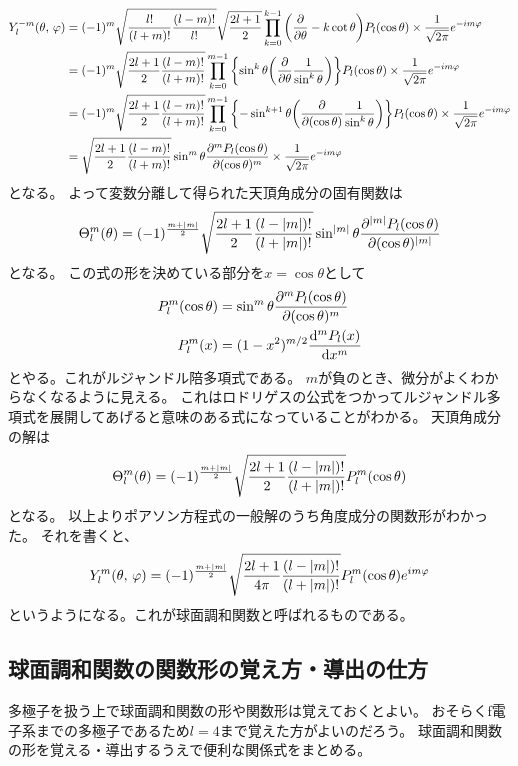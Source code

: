 \documentclass[../../master.tex]{subfiles}
\begin{document}
\begin{align}
	Y_l^{-m}(\theta,\,\varphi)
	 & =(-1)^m\sqrt{\frac{l!}{(l+m)!}\frac{(l-m)!}{l!}}\sqrt{\frac{2l+1}{2}} \prod_{k=0}^{k-1}\qty(\pdv{\theta}-k\cot\theta)P_l(\cos\theta)\times\frac{1}{\sqrt{2\pi}}e^{-im\varphi}                    \\
	 & =(-1)^m\sqrt{\frac{2l+1}{2}\frac{(l-m)!}{(l+m)!}} \prod_{k=0}^{m-1}\qty{\sin^k\theta\qty(\pdv{\theta}\frac{1}{\sin^k\theta})}P_l(\cos\theta)\times\frac{1}{\sqrt{2\pi}}e^{-im\varphi}            \\
	 & =(-1)^m\sqrt{\frac{2l+1}{2}\frac{(l-m)!}{(l+m)!}} \prod_{k=0}^{m-1}\qty{-\sin^{k+1}\theta\qty(\pdv{(\cos\theta)}\frac{1}{\sin^k\theta})}P_l(\cos\theta)\times\frac{1}{\sqrt{2\pi}}e^{-im\varphi} \\
	 & =\sqrt{\frac{2l+1}{2}\frac{(l-m)!}{(l+m)!}} \sin^{m}\theta\pdv[m]{P_l(\cos\theta)}{(\cos\theta)}\times\frac{1}{\sqrt{2\pi}}e^{-im\varphi}
\end{align}
となる。
よって変数分離して得られた天頂角成分の固有関数は
\begin{equation}
	\Theta_l^m(\theta) = (-1)^{\frac{m+\abs{m}}{2}}\sqrt{\frac{2l+1}{2}\frac{(l-\abs{m})!}{(l+\abs{m})!}} \sin^{\abs{m}}\theta\pdv[\abs{m}]{P_l(\cos\theta)}{(\cos\theta)}
\end{equation}
となる。
この式の形を決めている部分を\(x=\cos\theta\)として
\begin{align}
	P_l^m(\cos\theta) &= \sin^m\theta\pdv[m]{P_l(\cos\theta)}{(\cos\theta)}\\
	P_l^m(x) &=(1-x^2)^{m/2}\dv[m]{P_l(x)}{x}
\end{align}
とやる。これがルジャンドル陪多項式である。
\(m\)が負のとき、微分がよくわからなくなるように見える。
これはロドリゲスの公式をつかってルジャンドル多項式を展開してあげると意味のある式になっていることがわかる。
天頂角成分の解は
\begin{equation}
	\Theta_l^m(\theta) = (-1)^{\frac{m+\abs{m}}{2}}\sqrt{\frac{2l+1}{2}\frac{(l-\abs{m})!}{(l+\abs{m})!}} P_l^{m}(\cos\theta)
\end{equation}
となる。
以上よりポアソン方程式の一般解のうち角度成分の関数形がわかった。
それを書くと、
\begin{equation}
	Y_l^m(\theta,\,\varphi) = (-1)^{\frac{m+\abs{m}}{2}}\sqrt{\frac{2l+1}{4\pi}\frac{(l-\abs{m})!}{(l+\abs{m})!}}P_l^{m}(\cos\theta)e^{im\varphi}
\end{equation}
というようになる。これが球面調和関数と呼ばれるものである。

\subsection{球面調和関数の関数形の覚え方・導出の仕方}
多極子を扱う上で球面調和関数の形や関数形は覚えておくとよい。
おそらくf電子系までの多極子であるため\(l=4\)まで覚えた方がよいのだろう。
球面調和関数の形を覚える・導出するうえで便利な関係式をまとめる。
\end{document}
